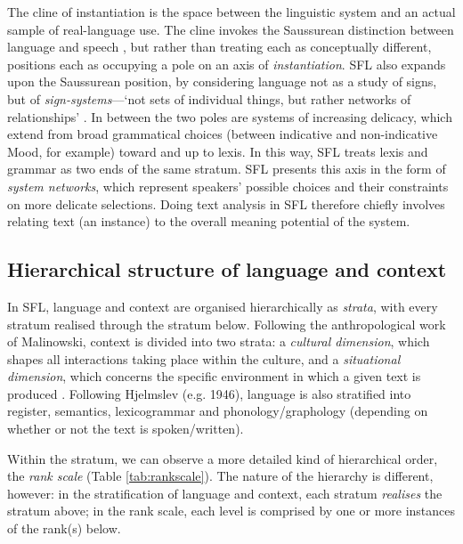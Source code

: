 The cline of instantiation is the space between the linguistic system and an actual sample of real-language use. The cline invokes the Saussurean distinction between language and speech \parencite*{saussure_course_1916}, but rather than treating each as conceptually different, positions each as occupying a pole on an axis of \emph{instantiation}. \gls{SFL} also expands upon the Saussurean position, by considering language not as a study of signs, but of \emph{sign-systems}---`not sets of individual things, but rather networks of relationships' \cite[p.~4]{halliday_language_1989}. In between the two poles are  systems of increasing delicacy, which extend from broad grammatical choices (between indicative and non\hyp{}indicative Mood, for example) toward and up to lexis. In this way, \gls{SFL} treats lexis and grammar as two ends of the same stratum. \gls{SFL} presents this axis in the form of \emph{system networks}, which represent speakers' possible choices and their constraints on more delicate selections. Doing text analysis in \gls{SFL} therefore chiefly involves relating text (an instance) to the overall meaning potential of the system.

\subsection{Hierarchical structure of language and context}

In \gls{SFL}, language and context are organised hierarchically as \emph{strata}, with every stratum realised through the stratum below. Following the anthropological work of Malinowski, context is divided into two strata: a \emph{cultural dimension}, which shapes all interactions taking place within the culture, and a \emph{situational dimension}, which concerns the specific environment in which a given text is produced \cite[p.~6]{halliday_language_1989}. Following Hjelmslev (e.g. 1946), language is also stratified into register, semantics, \gls{lexicogrammar} and phonology\slash graphology (depending on whether or not the text is spoken\slash written).

Within the  stratum, we can observe a more detailed kind of hierarchical order, the \emph{rank scale} (Table \ref{tab:rankscale}). The nature of the hierarchy is different, however: in the stratification of language and context, each stratum \emph{realises} the stratum above; in the rank scale, each level is comprised by one or more instances of the rank(s) below. \nocite{halliday_concept_1966}


